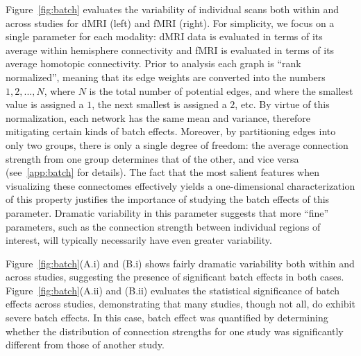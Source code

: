 \documentclass[11pt]{article}
\begin{document}
\begin{multicols}{2}
Figure~\ref{fig:batch} evaluates the variability of individual scans both within and across studies for dMRI (left) and fMRI (right). For simplicity, we focus on a single parameter for each modality:  dMRI data is evaluated in terms of its average within hemisphere connectivity and fMRI is evaluated in terms of its average homotopic connectivity. Prior to analysis each graph is ``rank normalized'', meaning that its edge weights are converted into the numbers $1,2,...,N$, where $N$ is the total number of potential edges, and where the smallest value is assigned a $1$, the next smallest is assigned a $2$, etc. By virtue of this normalization, each network has the same mean and variance, therefore mitigating certain kinds of batch effects. Moreover, by partitioning edges into only two groups, there is only a single degree of freedom: the average connection strength from one group determines that of the other, and vice versa (see~\ref{app:batch} for details).
The fact that the most salient features when visualizing these connectomes effectively yields a one-dimensional characterization of this property justifies the importance of studying the batch effects of this parameter.   
Dramatic variability in this parameter suggests that more ``fine'' parameters, such as the connection strength between individual regions of interest, will typically necessarily have even greater variability.

Figure~\ref{fig:batch}(A.i) and (B.i) shows fairly dramatic variability both within and across studies, suggesting the presence of significant batch effects in both cases. Figure~\ref{fig:batch}(A.ii) and (B.ii) evaluates the statistical significance of batch effects across studies, demonstrating that many studies, though not all, do exhibit severe batch effects. In this case, batch effect was quantified by determining whether the distribution of connection strengths for one study was significantly different from those of another study.


\end{multicols}
\end{document}
